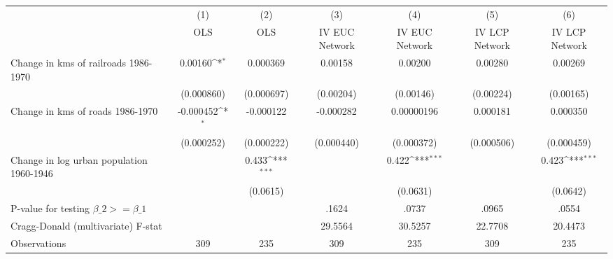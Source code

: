 {
\def\sym#1{\ifmmode^{#1}\else\(^{#1}\)\fi}
\begin{tabular}{l*{6}{c}}
\hline\hline
                &\multicolumn{1}{c}{(1)}&\multicolumn{1}{c}{(2)}&\multicolumn{1}{c}{(3)}&\multicolumn{1}{c}{(4)}&\multicolumn{1}{c}{(5)}&\multicolumn{1}{c}{(6)}\\
                &\multicolumn{1}{c}{OLS}&\multicolumn{1}{c}{OLS}&\multicolumn{1}{c}{IV EUC Network}&\multicolumn{1}{c}{IV EUC Network}&\multicolumn{1}{c}{IV LCP Network}&\multicolumn{1}{c}{IV LCP Network}\\
\hline
Change in kms of railroads 1986-1970&  0.00160\sym{*}  & 0.000369         &  0.00158         &  0.00200         &  0.00280         &  0.00269         \\
                &(0.000860)         &(0.000697)         &(0.00204)         &(0.00146)         &(0.00224)         &(0.00165)         \\
[1em]
Change in kms of roads 1986-1970&-0.000452\sym{*}  &-0.000122         &-0.000282         &0.00000196         & 0.000181         & 0.000350         \\
                &(0.000252)         &(0.000222)         &(0.000440)         &(0.000372)         &(0.000506)         &(0.000459)         \\
[1em]
Change in log urban population 1960-1946&                  &    0.433\sym{***}&                  &    0.422\sym{***}&                  &    0.423\sym{***}\\
                &                  & (0.0615)         &                  & (0.0631)         &                  & (0.0642)         \\
\hline
P-value for testing $\beta\_{2} >= \beta\_{1}$&                  &                  &    .1624         &    .0737         &    .0965         &    .0554         \\
Cragg-Donald (multivariate) F-stat&                  &                  &  29.5564         &  30.5257         &  22.7708         &  20.4473         \\
Observations    &      309         &      235         &      309         &      235         &      309         &      235         \\
\hline\hline
\end{tabular}
}
